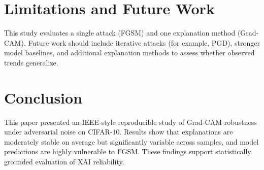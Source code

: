 \documentclass[conference]{IEEEtran}
\begin{document}
\section{Limitations and Future Work}
This study evaluates a single attack (FGSM) and one explanation method (Grad-CAM). Future work should include iterative attacks (for example, PGD), stronger model baselines, and additional explanation methods to assess whether observed trends generalize.

\section{Conclusion}
This paper presented an IEEE-style reproducible study of Grad-CAM robustness under adversarial noise on CIFAR-10. Results show that explanations are moderately stable on average but significantly variable across samples, and model predictions are highly vulnerable to FGSM. These findings support statistically grounded evaluation of XAI reliability.



\end{document}
